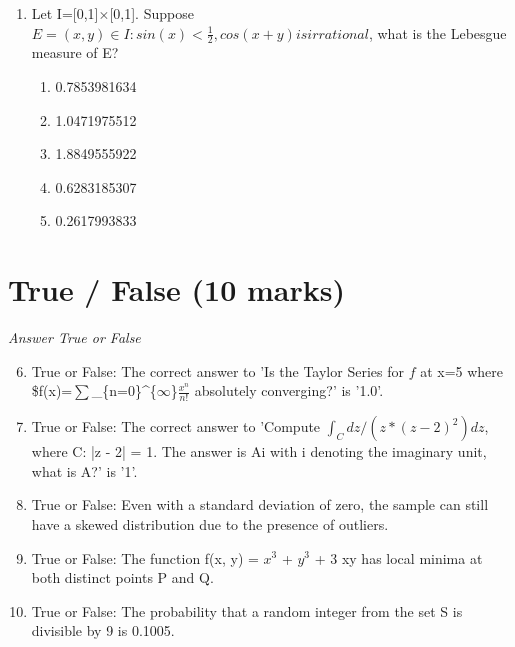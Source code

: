 \documentclass[12pt]{article}
\begin{document}
\begin{enumerate}[label=\arabic*.]
\begin{enumerate}[label=(\alph*)]
    \item 30 in. by 57 in.
\end{enumerate}
\item Let I=[0,1]\ensuremath{\times}[0,1]. Suppose $E={(x, y) \in I: sin(x)<\frac{1}{2}, cos(x+y) is irrational}$, what is the Lebesgue measure of E?
\begin{enumerate}[label=(\alph*)]
    \item 0.7853981634
    \item 1.0471975512
    \item 1.8849555922
    \item 0.6283185307
    \item 0.2617993833
\end{enumerate}
\end{enumerate}

\section*{True / False (10 marks)}
\textit{Answer True or False}
\begin{enumerate}[label=\arabic*.]
\setcounter{enumi}{5}
\item True or False: The correct answer to 'Is the Taylor Series for $f$ at x=5 where \$f(x)=\ensuremath{\sum}\_\{n=0\}^\{\ensuremath{\infty}\}\ensuremath{\frac{x^n}{n!}} absolutely converging?' is '1.0'.
\item True or False: The correct answer to 'Compute $\int_C dz / (z * (z-2)^2)dz$, where C: |z - 2| = 1. The answer is Ai with i denoting the imaginary unit, what is A?' is '1'.
\item True or False: Even with a standard deviation of zero, the sample can still have a skewed distribution due to the presence of outliers.
\item True or False: The function f(x, y) = $x^3$ + $y^3$ + 3 xy has local minima at both distinct points P and Q.
\item True or False: The probability that a random integer from the set S is divisible by 9 is 0.1005.
\end{enumerate}
\end{document}
